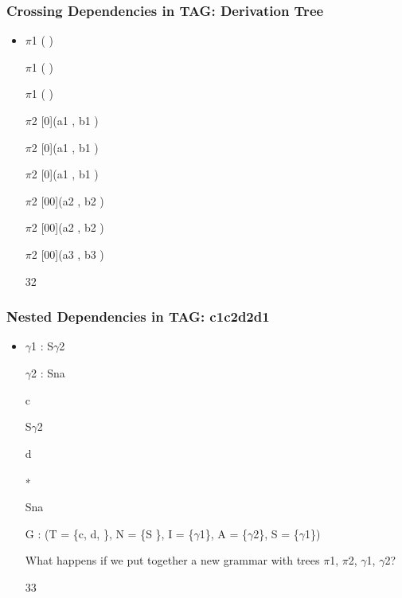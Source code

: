 \documentclass[compress,color=usenames]{beamer}
\begin{document}
\begin{frame}
\frametitle{Crossing Dependencies in TAG: Derivation Tree}

\begin{itemize}
\item




$\pi$1 ( )





$\pi$1 ( )





$\pi$1 ( )





$\pi$2 [0](a1 , b1 )





$\pi$2 [0](a1 , b1 )





$\pi$2 [0](a1 , b1 )





$\pi$2 [00](a2 , b2 )





$\pi$2 [00](a2 , b2 )


$\pi$2 [00](a3 , b3 )





32




\end{itemize}

\end{frame}

\begin{frame}
\frametitle{Nested Dependencies in TAG: c1c2d2d1}

\begin{itemize}
\item




$\gamma$1 : S$\gamma$2





$\gamma$2 : Sna


c





S$\gamma$2


d





∗


Sna





G : (T = \{c, d, \}, N = \{S \}, I = \{$\gamma$1\}, A = \{$\gamma$2\}, S = \{$\gamma$1\})


What happens if we put together a new grammar with trees $\pi$1, $\pi$2, $\gamma$1, $\gamma$2?


33




\end{itemize}

\end{frame}
\end{document}
